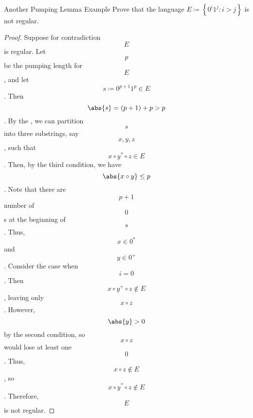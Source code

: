 \documentclass[12pt]{report}
\begin{document}
\begin{exbox}{Another Pumping Lemma Example}{}
    Prove that the language $E \coloneq \left\{ 0^i 1^j : i > j \right\}$ is not regular.
    \tcblower
    \begin{proof}
        Suppose for contradiction $$E$$ is regular. Let $$p$$ be the pumping length for $$E$$, and let $$s \coloneq 0^{p+1}1^p \in E$$. Then $$\abs{s} = (p+1) + p > p$$. By the , we can partition $$s$$ into three substrings, say $$x,y,z$$, such that $$x \circ y^* \circ z \in E$$. Then, by the third condition, we have $$\abs{x \circ y} \leq p$$. Note that there are $$p+1$$ number of $$0$$s at the beginning of $$s$$. Thus, $$x \in 0^*$$ and $$y \in 0^+$$. Consider the case when $$i = 0$$. Then $$x \circ y^+ \circ z \notin E$$, leaving only $$x \circ z$$. However, $$\abs{y} > 0$$ by the second condition, so $$x \circ z$$ would lose at least one $$0$$. Thus, $$x \circ z \notin E$$, so $$x \circ y^* \circ z \notin E$$. Therefore, $$E$$ is not regular.
    \end{proof}
\end{exbox}

\amzindex
\end{document}
